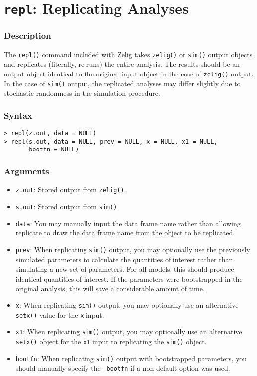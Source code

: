 \section{{\tt repl}: Replicating Analyses}\label{ss:replicate}

\subsubsection{Description}
The {\tt repl()} command included with Zelig takes {\tt zelig()}
or {\tt sim()} output objects and replicates (literally, re-runs) the
entire analysis.  The results should be an output object identical to
the original input object in the case of {\tt zelig()} output.  In the
case of {\tt sim()} output, the replicated analyses may differ
slightly due to stochastic randomness in the simulation procedure.  

\subsubsection{Syntax}
\begin{verbatim}
> repl(z.out, data = NULL)
> repl(s.out, data = NULL, prev = NULL, x = NULL, x1 = NULL,
       bootfn = NULL) 
\end{verbatim}

\subsubsection{Arguments}
\begin{itemize}
\item {\tt z.out}: Stored output from {\tt zelig()}.  
\item {\tt s.out}: Stored output from {\tt sim()}
\item {\tt data}: You may manually input the data frame name rather
  than allowing replicate to draw the data frame name from the object
  to be replicated.  
\item {\tt prev}: When replicating {\tt sim()} output, you may
  optionally use the previously simulated parameters to calculate the
  quantities of interest rather than simulating a new set of
  parameters.  For all models, this should produce identical
  quantities of interest.  If the parameters were
  bootstrapped in the original analysis, this will save a considerable
  amount of time.
\item {\tt x}: When replicating {\tt sim()} output, you may
  optionally use an alternative {\tt setx()} value for the {\tt x}
  input.  
\item {\tt x1}: When replicating {\tt sim()} output, you may
  optionally use an alternative {\tt setx()} object for the {\tt x1}
  input to replicating the {\tt sim()} object.
\item {\tt bootfn}: When replicating {\tt sim()} output with
  bootstrapped parameters, you should manually specify the {\tt
    bootfn} if a non-default option was used.  
\end{itemize}

